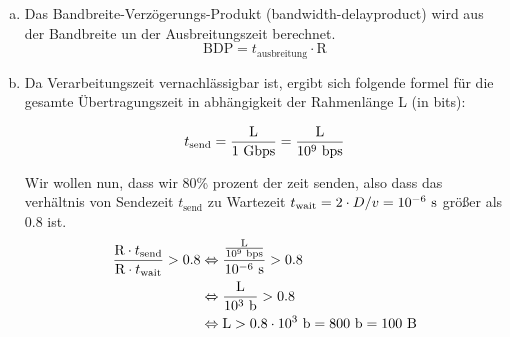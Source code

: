 \begin{enumerate}[a)]
    	\item Das Bandbreite-Verzögerungs-Produkt (bandwidth-delayproduct) wird aus der Bandbreite un der Ausbreitungszeit berechnet. $$\text{BDP}=t_{\text{ausbreitung}} \cdot \text{R}$$
    	\item Da Verarbeitungszeit vernachlässigbar ist, ergibt sich folgende formel für die gesamte Übertragungszeit in abhängigkeit der Rahmenlänge L (in bits):
    	
    	$$ t_\text{send} = \frac{\text{L}}{1\text{ Gbps}} = \frac{\text{L}}{10^9\text{ bps}} $$
    	
    	Wir wollen nun, dass wir 80\% prozent der zeit senden, also dass das verhältnis von Sendezeit $t_\text{send}$ zu Wartezeit $t_\text{wait} = 2 \cdot D/v = 10^{-6}\text{ s}$ größer als $0.8$ ist.
    	\begin{align*}
    		\frac{\text{R} \cdot t_\text{send}}{\text{R} \cdot t_\text{wait}} > 0.8 & \Leftrightarrow \frac{\frac{\text{L}}{10^9\text{ bps}}}{10^{-6}\text{ s}} > 0.8\\
    		& \Leftrightarrow \frac{\text{L}}{10^3\text{ b}} > 0.8 \\
    		& \Leftrightarrow \text{L} > 0.8 \cdot 10^3 \text{ b} = 800\text{ b} = 100 \text{  B}  
    	\end{align*}
    	
		    	
    	
\end{enumerate}




